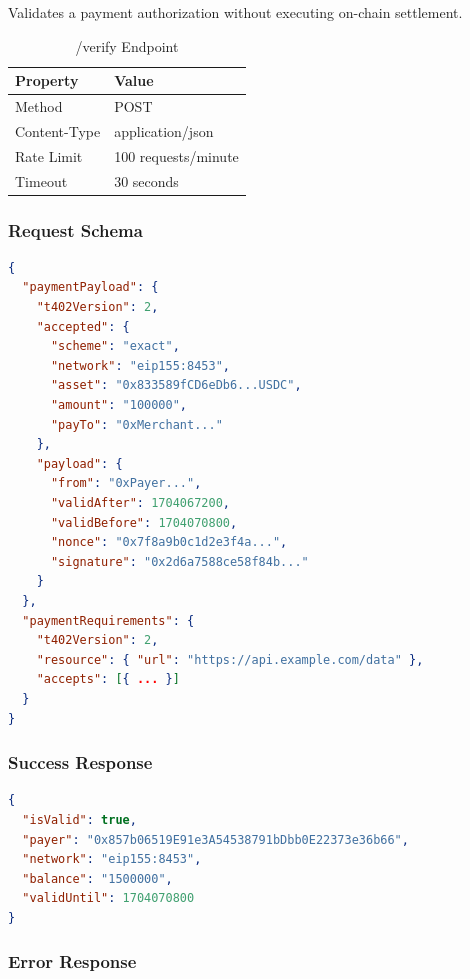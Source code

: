 Validates a payment authorization without executing on-chain settlement.

\begin{table}[htbp]
\centering
\caption{/verify Endpoint}
\label{tab:verify-endpoint}
\begin{tabular}{l l}
\toprule
\textbf{Property} & \textbf{Value} \\
\midrule
Method & POST \\
Content-Type & application/json \\
Rate Limit & 100 requests/minute \\
Timeout & 30 seconds \\
\bottomrule
\end{tabular}
\end{table}

\subsubsection{Request Schema}

\begin{lstlisting}[language=json,caption={/verify request body}]
{
  "paymentPayload": {
    "t402Version": 2,
    "accepted": {
      "scheme": "exact",
      "network": "eip155:8453",
      "asset": "0x833589fCD6eDb6...USDC",
      "amount": "100000",
      "payTo": "0xMerchant..."
    },
    "payload": {
      "from": "0xPayer...",
      "validAfter": 1704067200,
      "validBefore": 1704070800,
      "nonce": "0x7f8a9b0c1d2e3f4a...",
      "signature": "0x2d6a7588ce58f84b..."
    }
  },
  "paymentRequirements": {
    "t402Version": 2,
    "resource": { "url": "https://api.example.com/data" },
    "accepts": [{ ... }]
  }
}
\end{lstlisting}

\subsubsection{Success Response}

\begin{lstlisting}[language=json,caption={/verify success response}]
{
  "isValid": true,
  "payer": "0x857b06519E91e3A54538791bDbb0E22373e36b66",
  "network": "eip155:8453",
  "balance": "1500000",
  "validUntil": 1704070800
}
\end{lstlisting}

\subsubsection{Error Response}

